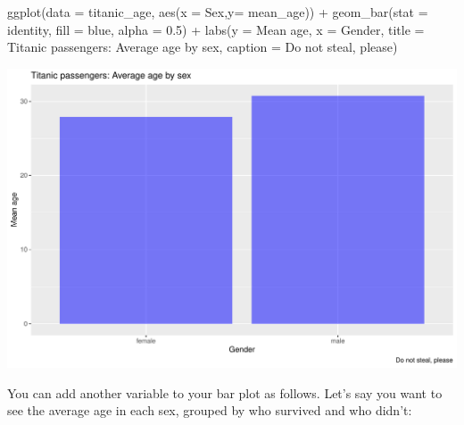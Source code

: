 \documentclass[
]{book}
\newenvironment{Shaded}{\begin{snugshade}}{\end{snugshade}}
\newcommand{\AttributeTok}[1]{\textcolor[rgb]{0.77,0.63,0.00}{#1}}
\newcommand{\FloatTok}[1]{\textcolor[rgb]{0.00,0.00,0.81}{#1}}
\newcommand{\FunctionTok}[1]{\textcolor[rgb]{0.00,0.00,0.00}{#1}}
\newcommand{\NormalTok}[1]{#1}
\newcommand{\SpecialCharTok}[1]{\textcolor[rgb]{0.00,0.00,0.00}{#1}}
\newcommand{\StringTok}[1]{\textcolor[rgb]{0.31,0.60,0.02}{#1}}
\begin{document}
\begin{Shaded}
\begin{Highlighting}[]
\FunctionTok{ggplot}\NormalTok{(}\AttributeTok{data =}\NormalTok{ titanic\_age, }
       \FunctionTok{aes}\NormalTok{(}\AttributeTok{x =}\NormalTok{ Sex,}\AttributeTok{y=}\NormalTok{ mean\_age)) }\SpecialCharTok{+} 
  \FunctionTok{geom\_bar}\NormalTok{(}\AttributeTok{stat =} \StringTok{\textquotesingle{}identity\textquotesingle{}}\NormalTok{, }\AttributeTok{fill =} \StringTok{\textquotesingle{}blue\textquotesingle{}}\NormalTok{, }\AttributeTok{alpha =} \FloatTok{0.5}\NormalTok{) }\SpecialCharTok{+} 
  \FunctionTok{labs}\NormalTok{(}\AttributeTok{y =} \StringTok{\textquotesingle{}Mean age\textquotesingle{}}\NormalTok{, }
       \AttributeTok{x =} \StringTok{\textquotesingle{}Gender\textquotesingle{}}\NormalTok{,}
       \AttributeTok{title =} \StringTok{\textquotesingle{}Titanic passengers: Average age by sex\textquotesingle{}}\NormalTok{,}
       \AttributeTok{caption =} \StringTok{\textquotesingle{}Do not steal, please\textquotesingle{}}\NormalTok{)}
\end{Highlighting}
\end{Shaded}

\includegraphics[width=694.08px]{figures/unnamed-chunk-168-1}

You can add another variable to your bar plot as follows. Let's say you want to see the average age in each sex, grouped by who survived and who didn't:
\end{document}
